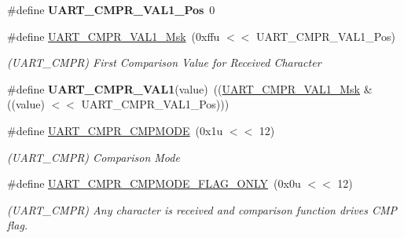 \begin{DoxyCompactItemize}
\#define {\bfseries U\+A\+R\+T\+\_\+\+C\+M\+P\+R\+\_\+\+V\+A\+L1\+\_\+\+Pos}~0
\item 
\mbox{\label{group__SAME70__UART_ga0e053dfa63c58565b9fb601ce05c428e}} 
\#define \mbox{\hyperlink{group__SAME70__UART_ga0e053dfa63c58565b9fb601ce05c428e}{U\+A\+R\+T\+\_\+\+C\+M\+P\+R\+\_\+\+V\+A\+L1\+\_\+\+Msk}}~(0xffu $<$$<$ U\+A\+R\+T\+\_\+\+C\+M\+P\+R\+\_\+\+V\+A\+L1\+\_\+\+Pos)
\begin{DoxyCompactList}\small\item\em (U\+A\+R\+T\+\_\+\+C\+M\+PR) First Comparison Value for Received Character \end{DoxyCompactList}\item 
\mbox{\label{group__SAME70__UART_ga67aecc6cc421d4ec4e12eff53d634b1c}} 
\#define {\bfseries U\+A\+R\+T\+\_\+\+C\+M\+P\+R\+\_\+\+V\+A\+L1}(value)~((\mbox{\hyperlink{group__SAMV71__UART_ga0e053dfa63c58565b9fb601ce05c428e}{U\+A\+R\+T\+\_\+\+C\+M\+P\+R\+\_\+\+V\+A\+L1\+\_\+\+Msk}} \& ((value) $<$$<$ U\+A\+R\+T\+\_\+\+C\+M\+P\+R\+\_\+\+V\+A\+L1\+\_\+\+Pos)))
\item 
\mbox{\label{group__SAME70__UART_gacfa8a3d1af798747e81691a0d09ccd6e}} 
\#define \mbox{\hyperlink{group__SAME70__UART_gacfa8a3d1af798747e81691a0d09ccd6e}{U\+A\+R\+T\+\_\+\+C\+M\+P\+R\+\_\+\+C\+M\+P\+M\+O\+DE}}~(0x1u $<$$<$ 12)
\begin{DoxyCompactList}\small\item\em (U\+A\+R\+T\+\_\+\+C\+M\+PR) Comparison Mode \end{DoxyCompactList}\item 
\mbox{\label{group__SAME70__UART_ga3b80a108593c4965e009a22c467b98b9}} 
\#define \mbox{\hyperlink{group__SAME70__UART_ga3b80a108593c4965e009a22c467b98b9}{U\+A\+R\+T\+\_\+\+C\+M\+P\+R\+\_\+\+C\+M\+P\+M\+O\+D\+E\+\_\+\+F\+L\+A\+G\+\_\+\+O\+N\+LY}}~(0x0u $<$$<$ 12)
\begin{DoxyCompactList}\small\item\em (U\+A\+R\+T\+\_\+\+C\+M\+PR) Any character is received and comparison function drives C\+MP flag. \end{DoxyCompactList}\item 
\mbox{\label{group__SAME70__UART_ga150f46983b40fcaa87d327062197971b}} 

\end{DoxyCompactItemize}

